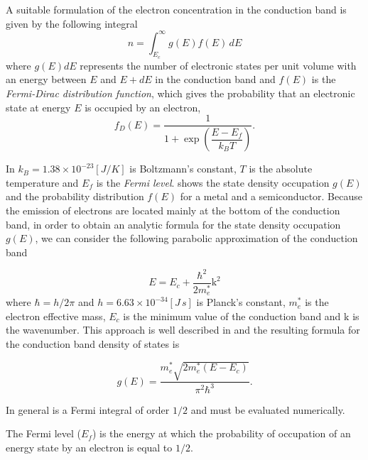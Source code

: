 A suitable formulation of the electron concentration in the conduction band is given by the following integral
\begin{equation}
\label{eq: carrier densiy integral}
n = \int_{E_c}^\infty g(E)f(E) \, dE
\end{equation}
where $g(E)dE$ represents the number of electronic states per unit volume with an energy between $E$ and $E+dE$ in the conduction band and $f(E)$ is the \textit{Fermi-Dirac distribution function}, which gives the probability that an electronic state at energy $E$ is occupied by an electron,
\begin{equation}
\label{eq: fermi dirac distribution}
f_D(E) = \dfrac{1}{1+\exp\left(\dfrac{E-E_f}{k_BT}\right)} .
\end{equation}

In  $k_B=1.38\times10^{-23}[J/K]$ is Boltzmann's constant, $T$ is the absolute temperature and $E_f$ is the \textit{Fermi level}. 
 shows  the state density occupation $g(E)$ and the probability distribution $f(E)$ for a metal and a semiconductor. Because the emission of electrons are located mainly at the bottom of the conduction band, in order to obtain an analytic formula for the state density occupation $g(E)$, we can consider the following parabolic approximation of the conduction band

\begin{equation}
\label{eq: approssimazione banda di conduzione}
E = E_c + \dfrac{\hbar^2}{2m_e^*}\mathrm{k}^2
\end{equation}
where $\hbar=h/2\pi$ and $h=6.63 \times 10^{-34} [J \, s]$ is Planck's constant, $m_e^*$ is the electron effective mass, $E_c$ is the minimum value of the conduction band and $\mathrm{k}$ is the wavenumber. This approach is well described in \cite{Pierret:SemiFunda} and the resulting formula for the conduction band density of states is

\begin{equation}
\label{eq: state density electron}
g(E) = \dfrac{m_e^*\sqrt{2m_e^*(E-E_c)}}{\pi^2\hbar^3}.
\end{equation}

In general  is a Fermi integral of order $1/2$ and must be evaluated numerically.
 
\begin{Definizione}
The Fermi level ($E_f$) is the energy at which the probability of occupation of an energy state by an electron is equal to $1/2$.
\end{Definizione}

